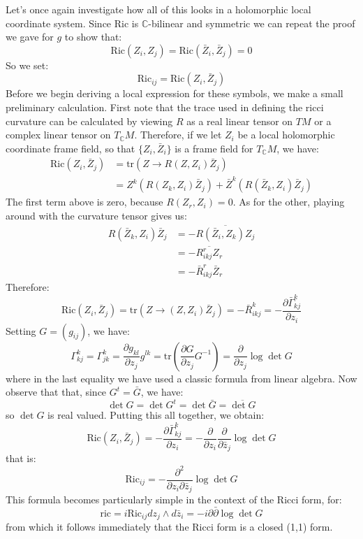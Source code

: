 \documentclass[11pt]{amsart}
\theoremstyle{definition}
\def \C{ \mathbb{C} }
\def \del{ \partial }
\def \delbar{ \bar{\partial} }
\def \Ric{ \text{Ric} }
\def \tr{ \text{tr} }
\def \ric{ \text{ric} }
\begin{document}
Let's once again investigate how all of this looks in a holomorphic local coordinate system.  Since $\Ric$ is $\C$-bilinear and symmetric we can repeat the proof we gave for $g$ to show that:
%
$$ \Ric(Z_i, Z_j ) = \Ric( \bar{Z}_i, \bar{Z}_j )= 0 $$
%
So we set:
%
$$ \Ric_{ij} = \Ric( Z_i, \bar{Z}_j ) $$
%
Before we begin deriving a local expression for these symbols, we make a small preliminary calculation.  First note that the trace used in defining the ricci curvature can be calculated by viewing $R$ as a real linear tensor on $TM$ or a complex linear tensor on $T_{\C}M$.  Therefore, if we let $Z_i$ be a local holomorphic coordinate frame field, so that $\{ Z_i, \bar{Z}_i \}$ is a frame field for $T_{\C}M$, we have:
%
\begin{align*}
\Ric( Z_i, \bar{Z}_j ) &= \tr( Z \rightarrow R( Z, Z_i ) \bar{Z}_j ) \\
&= Z^k( R(Z_k, Z_i) \bar{Z}_j ) + \bar{Z}^k ( R( \bar{Z}_k, Z_i ) \bar{Z}_j )
\end{align*}
%
The first term above is zero, because $R(Z_r, Z_i) = 0$.  As for the other, playing around with the curvature tensor gives us:
%
\begin{align*}
R( \bar{Z}_k, Z_i ) \bar{Z}_j &= - \overline{ R( \bar{Z}_i, Z_k ) Z_j } \\
&= - \overline{ R_{ikj}^r Z_r } \\
&= - \bar{R}_{ikj}^r \bar{Z}_r
\end{align*}
%
Therefore:
%
$$ \Ric( Z_i, \bar{Z}_j ) = \tr( Z \rightarrow( Z, Z_i ) \bar{Z}_j ) = - \bar{R}_{ikj}^k = - \frac{ \del \bar{ \Gamma }_{kj}^k }{ \del z_i } $$
%
Setting $G = (g_{ij})$, we have:
%
$$ \Gamma_{kj}^k = \Gamma_{jk}^k = \frac{ \del g_{kl} }{ \del z_j } g^{lk} = \tr \left( \frac{ \del G }{ \del z_j } G^{-1} \right) = \frac{ \del }{ \del z_j } \log \det G $$
%
where in the last equality we have used a classic formula from linear algebra.  Now observe that that, since $G^t = \bar{G}$, we have:
%
$$ \det G = \det G^t = \det \bar{G} = \overline { \det G } $$
%
so $\det G$ is real valued.  Putting this all together, we obtain:
%
$$ \Ric( Z_i, \bar{Z}_j ) = - \frac{ \del \bar{ \Gamma }_{kj}^k }{ \del z_i } = - \frac{ \del }{ \del z_i } \frac{ \del }{ \del \bar{z}_j } \log \det G $$
%
that is:
%
$$ \Ric_{ij} = - \frac{ \del^2 }{ \del z_i \del \bar{z}_j } \log \det G $$
%
This formula becomes particularly simple in the context of the Ricci form, for:
%
$$ \ric = i \Ric_{ij} d z_j \wedge d \bar{z}_i = - i \del \delbar \log \det G $$
%
from which it follows immediately that the Ricci form is a closed (1,1) form.
\end{document}
